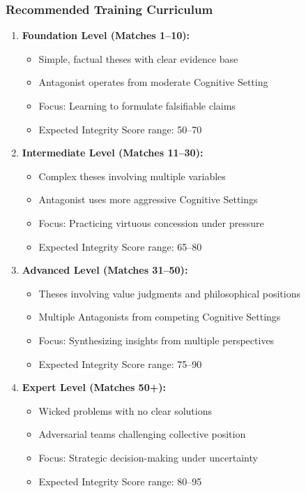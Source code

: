 \documentclass[11pt,a4paper]{article}
\begin{document}
\subsubsection{Recommended Training Curriculum}

\begin{enumerate}[leftmargin=*]
    \item \textbf{Foundation Level (Matches 1--10):}
    \begin{itemize}[nosep]
        \item Simple, factual theses with clear evidence base
        \item Antagonist operates from moderate Cognitive Setting
        \item Focus: Learning to formulate falsifiable claims
        \item Expected Integrity Score range: 50--70
    \end{itemize}
    
    \item \textbf{Intermediate Level (Matches 11--30):}
    \begin{itemize}[nosep]
        \item Complex theses involving multiple variables
        \item Antagonist uses more aggressive Cognitive Settings
        \item Focus: Practicing virtuous concession under pressure
        \item Expected Integrity Score range: 65--80
    \end{itemize}
    
    \item \textbf{Advanced Level (Matches 31--50):}
    \begin{itemize}[nosep]
        \item Theses involving value judgments and philosophical positions
        \item Multiple Antagonists from competing Cognitive Settings
        \item Focus: Synthesizing insights from multiple perspectives
        \item Expected Integrity Score range: 75--90
    \end{itemize}
    
    \item \textbf{Expert Level (Matches 50+):}
    \begin{itemize}[nosep]
        \item Wicked problems with no clear solutions
        \item Adversarial teams challenging collective position
        \item Focus: Strategic decision-making under uncertainty
        \item Expected Integrity Score range: 80--95
    \end{itemize}
\end{enumerate}
\end{document}
